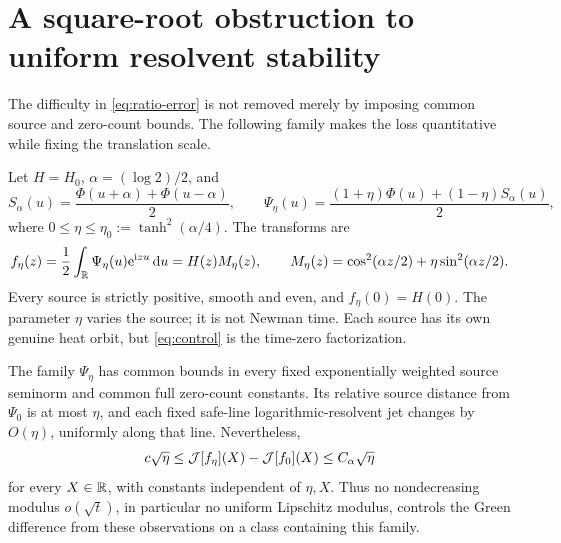 \section{A square-root obstruction to uniform resolvent stability}\label{sec:conditioning}

The difficulty in \eqref{eq:ratio-error} is not removed merely by
imposing common source and zero-count bounds. The following family
makes the loss quantitative while fixing the translation scale.

Let \(H=H_0\), \(\alpha=(\log2)/2\), and
\[
 S_\alpha(u)=\frac{\Phi(u+\alpha)+\Phi(u-\alpha)}2,\qquad
 \Psi_\eta(u)=\frac{(1+\eta)\Phi(u)+(1-\eta)S_\alpha(u)}2,
\]
where \(0\le\eta\le\eta_0:=\tanh^2(\alpha/4)\).
The transforms are
\begin{equation}\label{eq:control}
 f_\eta(z)=\frac12\int_\mathbb R\Psi_\eta(u)\mathrm e^{\mathrm i zu}\,\mathrm d u
 =H(z)M_\eta(z),\qquad
 M_\eta(z)=\cos^2(\alpha z/2)+\eta\sin^2(\alpha z/2).
\end{equation}
Every source is strictly positive, smooth and even, and
\(f_\eta(0)=H(0)\). The parameter \(\eta\) varies the source; it is
not Newman time. Each source has its own genuine heat orbit, but
\eqref{eq:control} is the time-zero factorization.

\begin{theorem}\label{thm:conditioning}
The family \(\Psi_\eta\) has common bounds in every fixed exponentially
weighted source seminorm and common full zero-count constants. Its
relative source distance from \(\Psi_0\) is at most \(\eta\), and
each fixed safe-line logarithmic-resolvent jet changes by \(O(\eta)\),
uniformly along that line. Nevertheless,
\begin{equation}\label{eq:delta-scale}
 c\sqrt\eta\le\mathcal J[f_\eta](X)-\mathcal J[f_0](X)
                  \le C_\alpha\sqrt\eta
\end{equation}
for every \(X\in\mathbb R\), with constants independent of \(\eta,X\).
Thus no nondecreasing modulus \(o(\sqrt t)\), in particular no
uniform Lipschitz modulus, controls the Green difference from these
observations on a class containing this family.
\end{theorem}

